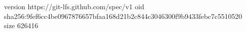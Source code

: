 version https://git-lfs.github.com/spec/v1
oid sha256:9fef6cc4be0967876657bfaa168d21b2c844c3046300f9b9433febc7c5510520
size 626416
